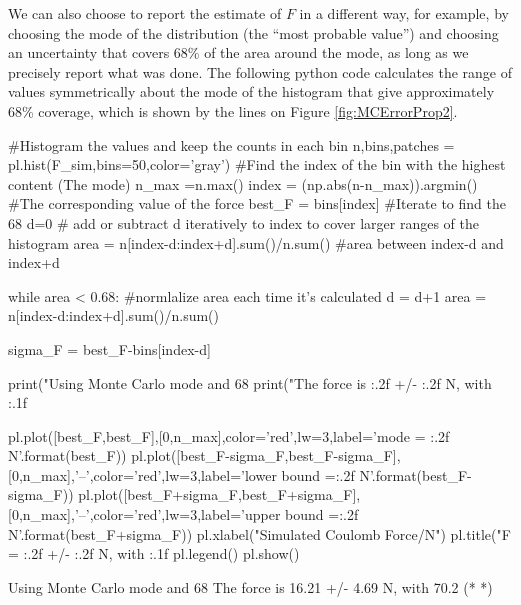 We can also choose to report the estimate of $F$ in a different way, for example, by choosing the mode of the distribution (the ``most probable value'') and choosing an uncertainty that covers 68\% of the area around the mode, as long as we precisely report what was done. The following python code calculates the range of values symmetrically about the mode of the histogram that give approximately 68\% coverage, which is shown by the lines on Figure \ref{fig:MCErrorProp2}.
\begin{python}[caption = Selecting 68\% coverage errors] 
#Histogram the values and keep the counts in each bin
n,bins,patches = pl.hist(F_sim,bins=50,color='gray')
#Find the index of the bin with the highest content (The mode)
n_max =n.max()
index = (np.abs(n-n_max)).argmin()
#The corresponding value of the force
best_F = bins[index]
#Iterate to find the 68%
d=0 # add or subtract d iteratively to index to cover larger ranges of the histogram
area = n[index-d:index+d].sum()/n.sum() #area between index-d and index+d

while area < 0.68: #normlalize area each time it's calculated
    d = d+1
    area = n[index-d:index+d].sum()/n.sum()
 
sigma_F = best_F-bins[index-d]

print("Using Monte Carlo mode and 68%
print("The force is {:.2f} +/- {:.2f} N, with {:.1f}%

pl.plot([best_F,best_F],[0,n_max],color='red',lw=3,label='mode = {:.2f} N'.format(best_F))
pl.plot([best_F-sigma_F,best_F-sigma_F],[0,n_max],'--',color='red',lw=3,label='lower bound ={:.2f} N'.format(best_F-sigma_F))
pl.plot([best_F+sigma_F,best_F+sigma_F],[0,n_max],'--',color='red',lw=3,label='upper bound ={:.2f} N'.format(best_F+sigma_F))
pl.xlabel("Simulated Coulomb Force/N")
pl.title("F = {:.2f} +/- {:.2f} N, with {:.1f}%
pl.legend()
pl.show()
\end{python}
\begin{poutput}
Using Monte Carlo mode and 68%
The force is 16.21 +/- 4.69 N, with 70.2%
(*  *)
\end{poutput}

